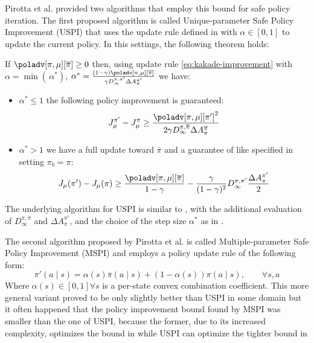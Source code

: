 Pirotta et al. provided two algorithms that employ this bound for safe policy iteration. The first proposed algorithm is called Unique-parameter Safe Policy Improvement (USPI) that uses the update rule defined in  with $\alpha\in [0,1]$ to update the current policy. In this settings, the following theorem holds:

\begin{theorem}
\label{th:pirotta-algo}
If $\poladv[\pi, \mu][\overline{\pi}] \geq 0$ then, using update rule \ref{eq:kakade-improvement} with $\alpha = \min(\, \alpha^*)$, $\alpha^* = \frac{(1-\gamma)\poladv[\pi, \mu][\overline{\pi}]}{\gamma D_\infty^{\pi, \pi'}\Delta A_\pi^{\pi'}}$ we have:
\begin{itemize}
\item $\alpha^* \leq 1$ the following policy improvement is guaranteed:
\[
J_\mu^{\pi'} - J_\mu^\pi \geq \frac{{\poladv[\pi, \mu][\pi']}^2}{2\gamma D_\infty^{\pi, \overline{\pi}}\Delta A_\pi^{\overline{\pi}}}
\]
\item $\alpha^* > 1$ we have a full update toward $\overline{\pi}$ and a guarantee of like specified in  setting $\pi_b = \pi$:
\begin{equation}
J_{\mu}(\pi') - J_\mu(\pi) \geq \frac{\poladv[\pi, \mu][\overline{\pi}]}{1-\gamma} - \frac{\gamma}{(1-\gamma)^2}{D_\infty^{\pi, \pi'}} \frac{\Delta A_{\pi}^{\pi'}}{2}
\end{equation}
\end{itemize}
\end{theorem}

The underlying algorithm for USPI is similar to , with the additional evaluation of $D_\infty^{\pi, \overline{\pi}}$ and $\Delta A_\pi^{\pi'}$, and the choice of the step size $\alpha^*$ as in .

The second algorithm proposed by Pirotta et al. is called Multiple-parameter Safe Policy Improvement (MSPI) and employs a policy update rule of the following form:
\[
\pi'(a\mid s) = \alpha(s)\overline{\pi}(a\mid s) + (1-\alpha(s))\pi(a\mid s),\qquad\forall s,a
\]
Where $\alpha(s)\in [0,1] \forall s$ is a per-state convex combination coefficient. This more general variant proved to be only slightly better than USPI in some domain but it often happened that the policy improvement bound found by MSPI was smaller than the one of USPI, because the former, due to its increased complexity, optimizes the bound in  while USPI can optimize the tighter bound in 

